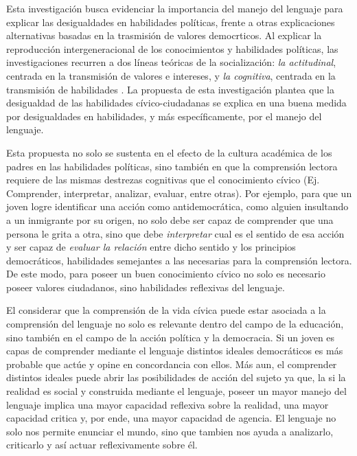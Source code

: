 \documentclass[12pt,twoside]{templates/facsothesis}
\begin{document}
Esta investigación busca evidenciar la importancia del manejo del lenguaje para explicar las desigualdades en habilidades políticas, frente a otras explicaciones alternativas basadas en la trasmisión de valores democrticos. Al explicar la reproducción intergeneracional de los conocimientos y habilidades políticas, las investigaciones recurren a dos líneas teóricas de la socialización: \emph{la actitudinal}, centrada en la transmisión de valores e intereses, y \emph{la cognitiva}, centrada en la transmisión de habilidades \citep{miranda_Political_2018}. La propuesta de esta investigación plantea que la desigualdad de las habilidades cívico-ciudadanas se explica en una buena medida por desigualdades en habilidades, y más específicamente, por el manejo del lenguaje.

Esta propuesta no solo se sustenta en el efecto de la cultura académica de los padres en las habilidades políticas, sino también en que la comprensión lectora requiere de las mismas destrezas cognitivas que el conocimiento cívico (Ej. Comprender, interpretar, analizar, evaluar, entre otras). Por ejemplo, para que un joven logre identificar una acción como antidemocrática, como alguien insultando a un inmigrante por su origen, no solo debe ser capaz de comprender que una persona le grita a otra, sino que debe \emph{interpretar} cual es el sentido de esa acción y ser capaz de \emph{evaluar la relación} entre dicho sentido y los principios democráticos, habilidades semejantes a las necesarias para la comprensión lectora. De este modo, para poseer un buen conocimiento cívico no solo es necesario poseer valores ciudadanos, sino habilidades reflexivas del lenguaje.

El considerar que la comprensión de la vida cívica puede estar asociada a la comprensión del lenguaje no solo es relevante dentro del campo de la educación, sino también en el campo de la acción política y la democracia. Si un joven es capas de comprender mediante el lenguaje distintos ideales democráticos es más probable que actúe y opine en concordancia con ellos. Más aun, el comprender distintos ideales puede abrir las posibilidades de acción del sujeto ya que, la si la realidad es social y construida mediante el lenguaje, poseer un mayor manejo del lenguaje implica una mayor capacidad reflexiva sobre la realidad, una mayor capacidad critica y, por ende, una mayor capacidad de agencia. El lenguaje no solo nos permite enunciar el mundo, sino que tambien nos ayuda a analizarlo, criticarlo y así actuar reflexivamente sobre él.
\end{document}
